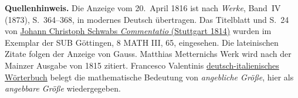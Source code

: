 \par\medskip\begin{small}\noindent\textbf{Quellenhinweis.} Die Anzeige vom 20.~April 1816 ist nach \textit{Werke}, Band~IV (1873), S.~364--368, in modernes Deutsch übertragen. Das Titelblatt und S.~24 von \href{https://gdz.sub.uni-goettingen.de/id/PPN603351808}{Johann Christoph Schwabs \textit{Commentatio} (Stuttgart 1814)} wurden im Exemplar der SUB Göttingen, 8 MATH III, 65, eingesehen. Die lateinischen Zitate folgen der Anzeige von Gauss. Matthias Metternichs Werk wird nach der Mainzer Ausgabe von 1815 zitiert. Francesco Valentinis \href{https://doi.org/10.3931/e-rara-91963}{deutsch-italienisches Wörterbuch} belegt die mathematische Bedeutung von \textit{angebliche Größe}, hier als \textit{angebbare Größe} wiedergegeben.\par\end{small}
